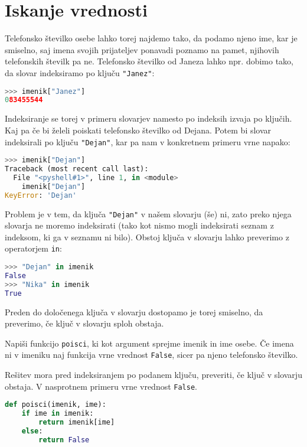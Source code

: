 \section{Iskanje vrednosti}
Telefonsko številko osebe lahko torej najdemo tako, da podamo njeno ime, kar je smiselno, saj imena svojih prijateljev ponavadi poznamo na pamet, njihovih telefonskih številk pa ne. Telefonsko številko od Janeza lahko npr. dobimo tako, da slovar indeksiramo po ključu \texttt{"Janez"}:
\begin{lstlisting}[language=Python, showstringspaces=false]
>>> imenik["Janez"]
083455544
\end{lstlisting}
Indeksiranje se torej v primeru slovarjev namesto po indeksih izvaja po ključih. Kaj pa če bi želeli poiskati telefonsko številko od Dejana. Potem bi slovar indeksirali po ključu \texttt{"Dejan"}, kar pa nam v konkretnem primeru vrne napako:
\begin{lstlisting}[language=Python, showstringspaces=false]
>>> imenik["Dejan"]
Traceback (most recent call last):
  File "<pyshell#1>", line 1, in <module>
    imenik["Dejan"]
KeyError: 'Dejan'
\end{lstlisting}
Problem je v tem, da ključa \texttt{"Dejan"} v našem slovarju (še) ni, zato preko njega slovarja ne moremo indeksirati (tako kot nismo mogli indeksirati seznam z indeksom, ki ga v seznamu ni bilo). Obstoj ključa v slovarju lahko preverimo z operatorjem \texttt{in}:
\begin{lstlisting}[language=Python, showstringspaces=false]
>>> "Dejan" in imenik
False
>>> "Nika" in imenik
True
\end{lstlisting}
Preden do določenega ključa v slovarju dostopamo je torej smiselno, da preverimo, če ključ v slovarju sploh obstaja.
\begin{zgled}
Napiši funkcijo \texttt{poisci}, ki kot argument sprejme imenik in ime osebe. Če imena ni v imeniku naj funkcija vrne vrednost \texttt{False}, sicer pa njeno telefonsko številko.
\end{zgled}
\begin{resitev} Rešitev mora pred indeksiranjem po podanem ključu, preveriti, če ključ v slovarju obstaja. V nasprotnem primeru vrne vrednost \texttt{False}. 
\begin{lstlisting}[language=Python, showstringspaces=false]
def poisci(imenik, ime):
    if ime in imenik:
        return imenik[ime]
    else:
        return False
\end{lstlisting}
\end{resitev}

